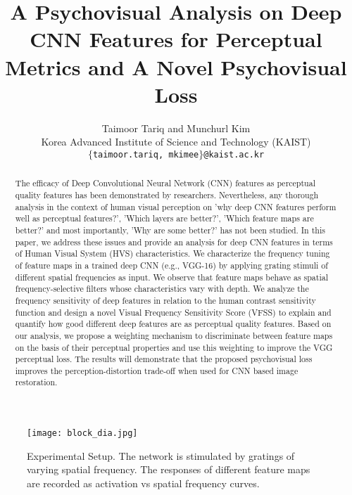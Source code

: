 \documentclass[10pt,twocolumn,letterpaper]{article}
\begin{document}
\title{A Psychovisual Analysis on Deep CNN Features for Perceptual Metrics and A Novel Psychovisual Loss}

\author{Taimoor Tariq and Munchurl Kim\\
Korea Advanced Institute of Science and Technology (KAIST)\\
{\tt\small $\{$taimoor.tariq, mkimee$\}$@kaist.ac.kr}
\\
}

\maketitle

\begin{figure*}[t!]
\texttt{[image: block\_dia.jpg]}
\caption{Experimental Setup. The network is stimulated by gratings of varying spatial frequency. The responses of different feature maps are recorded as activation vs spatial frequency curves.}
\label{fig:Spike_Sorting}
\end{figure*}

\begin{abstract}
   The efficacy of Deep Convolutional Neural Network (CNN) features as perceptual quality features has been demonstrated by researchers. Nevertheless, any thorough analysis in the context of human visual perception on 'why deep CNN features perform well as perceptual features?', 'Which layers are better?', 'Which feature maps are better?' and most importantly, 'Why are some better?' has not been studied. In this paper, we address these issues and provide an analysis for deep CNN features in terms of Human Visual System (HVS) characteristics. We characterize the frequency tuning of feature maps in a trained deep CNN (e.g., VGG-16) by applying grating stimuli of different spatial frequencies as input. We observe that feature maps behave as spatial frequency-selective filters whose characteristics vary with depth. We analyze the frequency sensitivity of deep features in relation to the human contrast sensitivity function and design a novel Visual Frequency Sensitivity Score (VFSS) to explain and quantify how good different deep features are as perceptual quality features. Based on our analysis, we propose a weighting mechanism to discriminate between feature maps on the basis of their perceptual properties and use this weighting to improve the VGG perceptual loss. The results will demonstrate that the proposed psychovisual loss improves the perception-distortion trade-off when used for CNN based image restoration.
\end{abstract}
\end{document}

